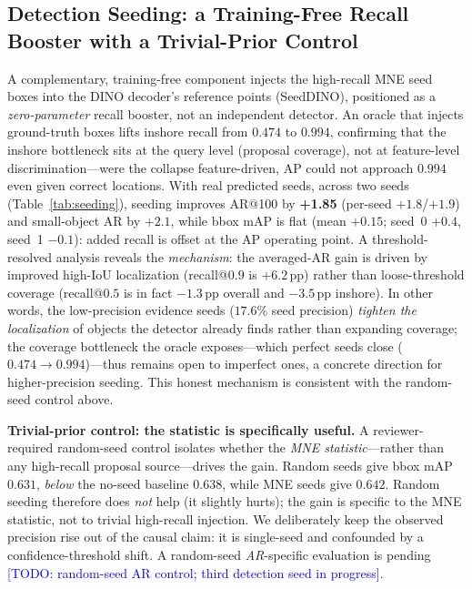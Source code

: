 \documentclass[journal]{IEEEtran}
\newcommand{\TODO}[1]{\textcolor{blue}{[TODO: #1]}}
\begin{document}
\subsection{Detection Seeding: a Training-Free Recall Booster with a Trivial-Prior Control}
\label{ssec:seeding}
A complementary, training-free component injects the high-recall MNE seed boxes into the DINO decoder's reference points (SeedDINO), positioned as a \emph{zero-parameter} recall booster, not an independent detector. An oracle that injects ground-truth boxes lifts inshore recall from $0.474$ to $0.994$, confirming that the inshore bottleneck sits at the query level (proposal coverage), not at feature-level discrimination---were the collapse feature-driven, AP could not approach $0.994$ even given correct locations. With real predicted seeds, across two seeds (Table~\ref{tab:seeding}), seeding improves AR@100 by \textbf{+1.85} (per-seed $+1.8$/$+1.9$) and small-object AR by $+2.1$, while bbox mAP is flat (mean $+0.15$; seed~0 $+0.4$, seed~1 $-0.1$): added recall is offset at the AP operating point. A threshold-resolved analysis reveals the \emph{mechanism}: the averaged-AR gain is driven by improved high-IoU localization (recall@$0.9$ is $+6.2$\,pp) rather than loose-threshold coverage (recall@$0.5$ is in fact $-1.3$\,pp overall and $-3.5$\,pp inshore). In other words, the low-precision evidence seeds ($17.6\%$ seed precision) \emph{tighten the localization} of objects the detector already finds rather than expanding coverage; the coverage bottleneck the oracle exposes---which perfect seeds close ($0.474\!\rightarrow\!0.994$)---thus remains open to imperfect ones, a concrete direction for higher-precision seeding. This honest mechanism is consistent with the random-seed control above.

\textbf{Trivial-prior control: the statistic is specifically useful.} A reviewer-required random-seed control isolates whether the \emph{MNE statistic}---rather than any high-recall proposal source---drives the gain. Random seeds give bbox mAP $0.631$, \emph{below} the no-seed baseline $0.638$, while MNE seeds give $0.642$. Random seeding therefore does \emph{not} help (it slightly hurts); the gain is specific to the MNE statistic, not to trivial high-recall injection. We deliberately keep the observed precision rise out of the causal claim: it is single-seed and confounded by a confidence-threshold shift. A random-seed \emph{AR}-specific evaluation is pending \TODO{random-seed AR control; third detection seed in progress}.
\end{document}
